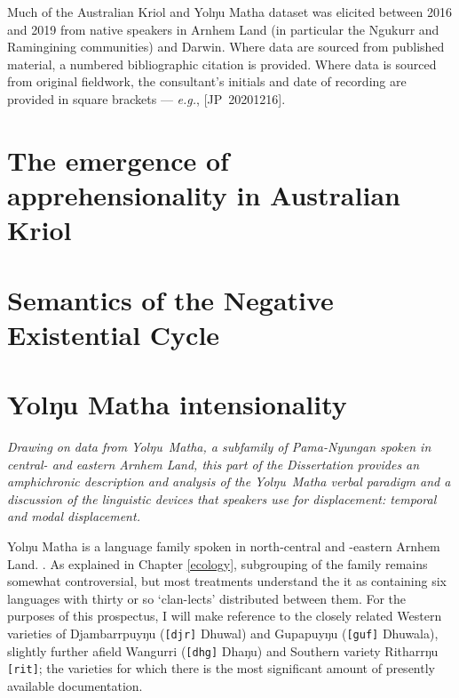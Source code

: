 \documentclass[12pt,dvipsnames]{report}
\newcommand{\mcom}[1]
{\marginpar{\color{black}\raggedleft\raggedright\hspace{0pt}\linespread{0.9}\footnotesize{#1}}}
\begin{document}
Much of the Australian Kriol and Yolŋu Matha dataset was elicited between 2016 and 2019 from native speakers in Arnhem Land (in particular the Ngukurr and Ramingining communities) and Darwin. Where data are sourced from published material, a numbered bibliographic citation is provided. Where data is sourced from original fieldwork, the consultant's initials and date of recording are provided in square brackets --- \textit{e.g.}, [JP~20201216].

\part{The emergence of apprehensionality in Australian Kriol}\label{bambai}
 



%

\part{Semantics of the Negative Existential Cycle}\label{NEC}



%



\iffalse
	\part{Yolŋu Matha intensionality}\label{yolngu}
	
		\noindent\sl Drawing on data from Yolŋu~Matha, a subfamily of Pama-Nyungan spoken in central- and eastern Arnhem Land, this part of the Dissertation provides an amphichronic description and analysis of the Yolŋu~Matha verbal paradigm and a discussion of the linguistic devices that speakers use for displacement: temporal and modal displacement.
		
		Yolŋu Matha is a language family spoken in north-central and -eastern Arnhem Land. \mcom{Xref here to introductory chapter/s}. As explained in Chapter \ref{ecology}, subgrouping of the family remains somewhat controversial, but most treatments understand the it as containing six languages with thirty or so `clan-lects' distributed between them. For the purposes of this prospectus, I will make reference to the closely related Western varieties of Djambarrpuyŋu (\texttt{[djr]} Dhuwal) and Gupapuyŋu (\texttt{[guf]} Dhuwala), slightly further afield Wangurri (\texttt{[dhg]} Dhaŋu) and Southern variety Ritharrŋu \texttt{[rit]}; the varieties for which there is the most significant amount of presently available documentation.
		
\end{document}
